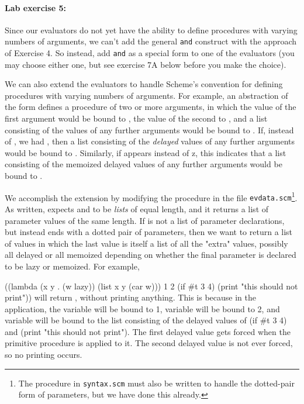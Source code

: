 \paragraph{Lab exercise 5:}
Since our evaluators do not yet have the ability to define procedures with
varying numbers of arguments, we can't add the general {\tt and} construct
with the approach of Exercise 4.  So instead, add {\tt and} as a special
form to one of the evaluators (you may choose either one, but see exercise
7A below before you make the choice).

\medskip

We can also extend the evaluators to handle Scheme's convention
for defining procedures with varying numbers of arguments.  For
example, an abstraction of the form 
defines a procedure of two or more arguments, in which the value of
the first argument would be bound to , the value of the second
to , and a list consisting of the values of any further
arguments would be bound to .  If, instead of , we had
, then a list consisting of the {\em delayed} values of
any further arguments would be bound to .  Similarly, if  appears instead of z, this indicates that a list consisting of
the memoized delayed values of any further arguments would be bound to
.

We accomplish the extension by modifying the procedure
 in the file {\tt evdata.scm}\footnote{The
procedure  in {\tt syntax.scm} must also be written
to handle the dotted-pair form of parameters, but we have done this
already.}.  As written, 
expects  and  to be {\em lists} of equal length,
and it returns a list of parameter values of the same length.  If
 is not a list of parameter declarations, but instead ends
with a dotted pair of parameters, then we want  to
return a list of values in which the last value is itself a list of all
the "extra" values, possibly all delayed or all memoized depending on
whether the final parameter is declared to be lazy or memoized.  For
example,

\beginlisp
((lambda (x y . (w lazy)) (list x y (car w)))
 1  2  (if \#t 3 4)  (print "this should not print"))
\endlisp
will return , without printing anything.  This is because in
the application, the variable  will be bound to 1, variable
 will be bound to 2, and variable  will be bound to the
list consisting of the delayed values of
\beginlisp(if \#t 3 4)\endlisp
and
\beginlisp(print "this should not print").\endlisp
The first delayed value gets forced when the primitive procedure
 is applied to it.  The second delayed value is not ever
forced, so no printing occurs.

